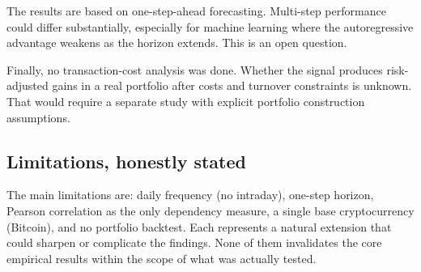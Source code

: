 The results are based on one-step-ahead forecasting. Multi-step performance could differ substantially, especially for machine learning where the autoregressive advantage weakens as the horizon extends. This is an open question.

Finally, no transaction-cost analysis was done. Whether the signal produces risk-adjusted gains in a real portfolio after costs and turnover constraints is unknown. That would require a separate study with explicit portfolio construction assumptions.

\subsection{Limitations, honestly stated}

The main limitations are: daily frequency (no intraday), one-step horizon, Pearson correlation as the only dependency measure, a single base cryptocurrency (Bitcoin), and no portfolio backtest. Each represents a natural extension that could sharpen or complicate the findings. None of them invalidates the core empirical results within the scope of what was actually tested.
